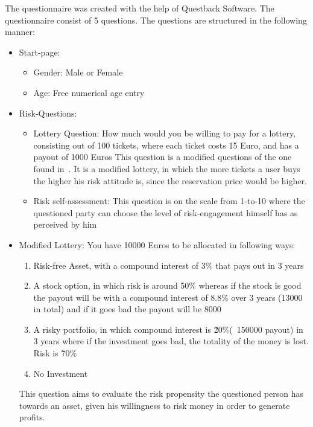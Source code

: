 \documentclass[12pt]{article}
\begin{document}
The questionnaire was created with the help of Questback Software. The questionnaire consist of 5 questions. The questions are structured in the following manner:
\begin{itemize}
    \item Start-page:
        \begin{itemize}
            \item Gender: Male or Female
            \item Age: Free numerical age entry
        \end{itemize}
    \item Risk-Questions:
        \begin{itemize}
            \item Lottery Question: How much would you be willing to pay for a lottery, consisting out of 100 tickets, where each ticket costs 15 Euro, and has a payout of 1000 Euros
                This question is a modified questions of the one found in~\cite{10.1.1.558.6537.pdf}. It is a modified lottery, in which the more tickets a user buys the higher his risk attitude is, since the reservation price would be higher.
            \item Risk self-assessment: This question is on the scale from 1-to-10 where the questioned party can choose the level of risk-engagement himself has as perceived by him
        \end{itemize}
    \item Modified Lottery: You have 10000 Euros to be allocated in following ways:
        \begin{enumerate}
            \item Risk-free Asset, with a compound interest of 3\% that pays out in 3 years
            \item A stock option, in which risk is around 50\% whereas if the stock is good the payout will be with a compound interest of 8.8\% over 3 years (13000 in total) and if it goes bad the payout will be 8000 
            \item A risky portfolio, in which compound interest is \~20\%(~150000 payout) in 3 years where if the investment goes bad, the totality of the money is lost. Risk is \~70\%
            \item No Investment
        \end{enumerate}
        This question aims to evaluate the risk propensity the questioned person has towards an asset, given his willingness to risk money in order to generate profits.
\end{itemize}
\end{document}
